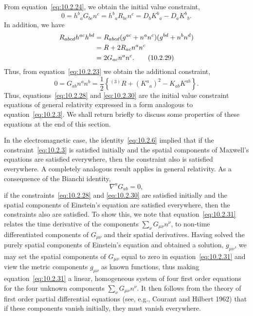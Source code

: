 From equation~\eqref{eq:10.2.24}, we obtain the initial value constraint,
\begin{equation}
  0=h^b{}_aG_{bc}n^c=h^b{}_aR_{bc}n^c
   =D_bK^b{}_a-D_aK^b{}_b.
  \tag{10.2.28}\label{eq:10.2.28}
\end{equation}
In addition, we have
\begin{align}
  R_{abcd}h^{ac}h^{bd}
  &=R_{abcd}(g^{ac}+n^an^c)(g^{bd}+n^bn^d) \notag\\
  &=R+2R_{ac}n^an^c \notag\\
  &=2G_{ac}n^an^c.
  \tag{10.2.29}\label{eq:10.2.29}
\end{align}
Thus, from equation~\eqref{eq:10.2.23} we obtain the additional constraint,
\begin{equation}
  0=G_{ab}n^an^b
   =\frac12\left\{{}^{(3)}R+(K^a{}_a)^2-K_{ab}K^{ab}\right\}.
  \tag{10.2.30}\label{eq:10.2.30}
\end{equation}
Thus, equations~\eqref{eq:10.2.28} and \eqref{eq:10.2.30} are the initial value
constraint equations of general relativity expressed in a form analogous to
equation~\eqref{eq:10.2.3}. We shall return briefly to discuss some properties of
these equations at the end of this section.

In the electromagnetic case, the identity~\eqref{eq:10.2.6} implied that if the
constraint~\eqref{eq:10.2.3} is satisfied initially and the spatial components of
Maxwell's equations are satisfied everywhere, then the constraint also is satisfied
everywhere. A completely analogous result applies in general relativity. As a
consequence of the Bianchi identity,
\begin{equation}
  \nabla^aG_{ab}=0,
  \tag{10.2.31}\label{eq:10.2.31}
\end{equation}
if the constraints~\eqref{eq:10.2.28} and \eqref{eq:10.2.30} are satisfied initially
and the spatial components of Einstein's equation are satisfied everywhere, then the
constraints also are satisfied. To show this, we note that
equation~\eqref{eq:10.2.31} relates the time derivative of the components
\(\sum_\nu G_{\mu\nu}n^\nu\), to non-time differentiated components of
\(G_{\mu\nu}\) and their spatial derivatives. Having solved the purely spatial
components of Einstein's equation and obtained a solution, \(g_{\mu\nu}\), we may set
the spatial components of \(G_{\mu\nu}\) equal to zero in equation~\eqref{eq:10.2.31}
and view the metric components \(g_{\mu\nu}\) as known functions, thus making
equation~\eqref{eq:10.2.31} a linear, homogeneous system of four first order equations
for the four unknown components \(\sum_\nu G_{\mu\nu}n^\nu\). It then follows from
the theory of first order partial differential equations (see, e.g., Courant and Hilbert
1962) that if these components vanish initially, they must vanish everywhere.

